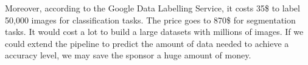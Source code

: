Moreover, according to the Google Data Labelling Service, it costs 35\$ to label 50,000 images for classification tasks. The price goes to 870\$ for segmentation tasks. It would cost a lot to build a large datasets with millions of images. If we could extend the pipeline to predict the amount of data needed to achieve a accuracy level, we may save the sponsor a huge amount of money. 
